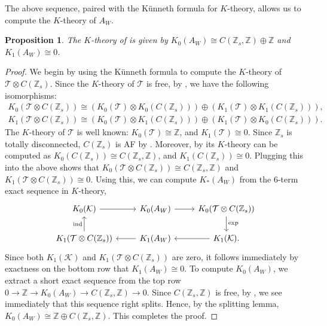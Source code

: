 \documentclass[pdftex]{sigma}
\newcommand{\Z}{{\mathbb Z}}
\numberwithin{equation}{section}
\newtheorem{Proposition}[Theorem]{Proposition}
 { \theoremstyle{definition}
\newtheorem{Definition}[Theorem]{Definition}
\newtheorem{Note}[Theorem]{Note}
\newtheorem{Example}[Theorem]{Example}
\newtheorem{Remark}[Theorem]{Remark} }
\begin{document}
The above sequence, paired with the K\"unneth formula for $K$-theory, allows us to compute the $K$-theory of $A_W$.
\begin{Proposition}
The $K$-theory of is given by
$K_0(A_W) \cong C(\Z_s,\Z) \oplus \Z$ and $ K_1(A_W) \cong 0$.
\end{Proposition}
\begin{proof}
We begin by using the K\"unneth formula to compute the $K$-theory of $\mathcal{T} \otimes C(\Z_s)$. Since the $K$-theory of $\mathcal{T}$ is free, by \cite{SC}, we have the following isomorphisms:
\begin{gather*}
K_0(\mathcal{T} \otimes C(\Z_s)) \cong (K_0(\mathcal{T}) \otimes K_0(C(\Z_s))) \oplus ( K_1(\mathcal{T}) \otimes K_1(C(\Z_s))),
\\
K_1(\mathcal{T} \otimes C(\Z_s)) \cong (K_0(\mathcal{T}) \otimes K_1(C(\Z_s))) \oplus ( K_1(\mathcal{T}) \otimes K_0(C(\Z_s))).
\end{gather*}
The $K$-theory of $\mathcal{T}$ is well known: $K_0(\mathcal{T}) \cong \Z$, and $K_1(\mathcal{T}) \cong 0$. Since $\Z_s$ is totally disconnected, $C(\Z_s)$ is AF by \cite[Example III.2.5]{KD}. Moreover, by \cite[Exercise 3.4]{RLL} its $K$-theory can be computed as $K_0(C(\Z_s)) \cong C(\Z_s,\Z)$, and $K_1(C(\Z_s)) \cong 0$. Plugging this into the above shows that
$
K_0(\mathcal{T} \otimes C(\Z_s)) \cong C(\Z_s,\Z)$ and $ K_1(\mathcal{T} \otimes C(\Z_s)) \cong 0$.
Using this, we can compute $K_*(A_W)$ from the $6$-term exact sequence in $K$-theory,
\begin{equation*}
\begin{tikzcd}
 K_0(\mathcal{K}) \arrow{r} & K_0(A_W) \arrow{r} & K_0(\mathcal{T} \otimes C(\Z_s)) \arrow{d}{\textup{exp}} \\
 K_1(\mathcal{T} \otimes C(\Z_s)) \arrow{u}{\textup{ind}} & K_1(A_W) \arrow{l} & K_1(\mathcal{K}) \arrow{l}.
\end{tikzcd}
\end{equation*}
Since both $K_1(\mathcal{K})$ and $K_1(\mathcal{T} \otimes C(\Z_s))$ are zero, it follows immediately by exactness on the bottom row that
$K_1(A_W) \cong 0$.
To compute $K_0(A_W)$, we extract a short exact sequence from the top row
$0 \to \Z \to K_0(A_W) \to C(\Z_s,\Z) \to 0$.
Since $C(\Z_s,\Z)$ is free, by \cite[Exercise~7.7.5]{HR}, we see immediately that this sequence right splits. Hence, by the splitting lemma,
$K_0(A_W) \cong \Z \oplus C(\Z_s,\Z)$.
This completes the proof.
\end{proof}
\end{document}
